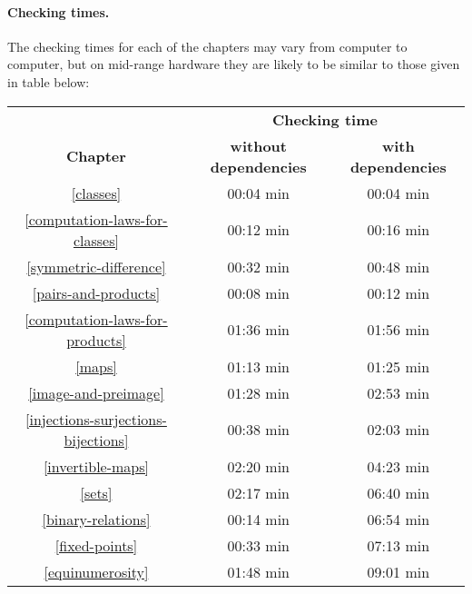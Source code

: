 \documentclass[12pt,oneside]{book}
\begin{document}
  \paragraph*{Checking times.}
  The checking times for each of the chapters may vary from computer to
  computer, but on mid-range hardware they are likely to be similar to those
  given in table below:

  \begin{center}
    \begin{tabular}{c|c|c}
      
      & \multicolumn{2}{c}{\textbf{Checking time}}
      \\
      \textbf{Chapter}
      & \textbf{without dependencies}
      & \textbf{with dependencies}
      \\ \hline
      \ref{classes}
      & 00:04 min
      & 00:04 min
      \\
      \ref{computation-laws-for-classes}
      & 00:12 min
      & 00:16 min
      \\
      \ref{symmetric-difference}
      & 00:32 min
      & 00:48 min
      \\
      \ref{pairs-and-products}
      & 00:08 min
      & 00:12 min
      \\
      \ref{computation-laws-for-products}
      & 01:36 min
      & 01:56 min
      \\
      \ref{maps}
      & 01:13 min
      & 01:25 min
      \\
      \ref{image-and-preimage}
      & 01:28 min
      & 02:53 min
      \\
      \ref{injections-surjections-bijections}
      & 00:38 min
      & 02:03 min
      \\
      \ref{invertible-maps}
      & 02:20 min
      & 04:23 min
      \\
      \ref{sets}
      & 02:17 min
      & 06:40 min
      \\
      \ref{binary-relations}
      & 00:14 min
      & 06:54 min
      \\
      \ref{fixed-points}
      & 00:33 min
      & 07:13 min
      \\
      \ref{equinumerosity}
      & 01:48 min
      & 09:01 min
    \end{tabular}
  \end{center}


  
  
  
  
  
  
  
  
  
  
  
  
  
\end{document}
